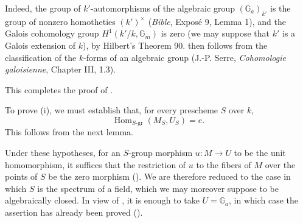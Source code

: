 
Indeed, the group of \(k'\)-automorphisms of the algebraic group
\((\mathbb G_a)_{k'}\) is the group of nonzero homotheties
\((k')^\times\) (\textit{Bible}, Exposé 9, Lemma 1), and the Galois
cohomology group \(H^1(k'/k,\mathbb G_m)\) is zero (we may suppose that
\(k'\) is a Galois extension of \(k\)), by Hilbert's Theorem 90.
 then follows from the classification of the \(k\)-forms
of an algebraic group (J.-P. Serre, \textit{Cohomologie
galoisienne}, Chapter III, 1.3).

This completes the proof of .


To prove (i), we must establish that, for every prescheme \(S\) over
\(k\),
\[
  \operatorname{Hom}_{S\text{-gr}}(M_S,U_S)=e.
\]
This follows from the next lemma.


Under these hypotheses, for an \(S\)-group morphism \(u:M\to U\) to
be the unit homomorphism, it suffices that the restriction of \(u\) to
the fibers of \(M\) over the points of \(S\) be the zero morphism
().  We are therefore reduced to the case in which \(S\)
is the spectrum of a field, which we may moreover suppose to be
algebraically closed.  In view of , it is enough to take
\(U=\mathbb G_a\), in which case the assertion has already been proved
().

